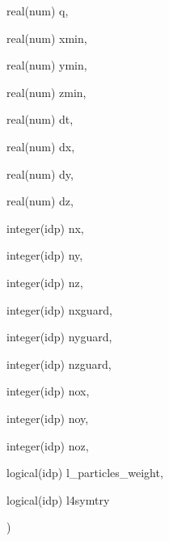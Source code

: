 {\begin{DoxyParamCaption}
\item[{real(num)}]{q, }
\item[{real(num)}]{xmin, }
\item[{real(num)}]{ymin, }
\item[{real(num)}]{zmin, }
\item[{real(num)}]{dt, }
\item[{real(num)}]{dx, }
\item[{real(num)}]{dy, }
\item[{real(num)}]{dz, }
\item[{integer(idp)}]{nx, }
\item[{integer(idp)}]{ny, }
\item[{integer(idp)}]{nz, }
\item[{integer(idp)}]{nxguard, }
\item[{integer(idp)}]{nyguard, }
\item[{integer(idp)}]{nzguard, }
\item[{integer(idp)}]{nox, }
\item[{integer(idp)}]{noy, }
\item[{integer(idp)}]{noz, }
\item[{logical(idp)}]{l\+\_\+particles\+\_\+weight, }
\item[{logical(idp)}]{l4symtry}
\end{DoxyParamCaption}
)}\hypertarget{current__deposition_8_f90_aa0e11e28c778e0f5357c21b9326ff40d}{}\label{current__deposition_8_f90_aa0e11e28c778e0f5357c21b9326ff40d}
